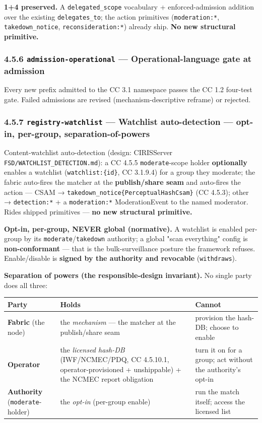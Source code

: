 \documentclass[11pt]{article}
\begin{document}
\textbf{1+4 preserved.} A \texttt{delegated\_scope} vocabulary + enforced-admission addition over the existing \texttt{delegates\_to}; the action primitives (\texttt{moderation:*}, \texttt{takedown\_notice}, \texttt{reconsideration:*}) already ship. \textbf{No new structural primitive.}


\subsubsection*{4.5.6 \texttt{admission-operational} — Operational-language gate at admission}


Every new prefix admitted to the CC 3.1 namespace passes the CC 1.2 four-test gate. Failed admissions are revised (mechanism-descriptive reframe) or rejected.


\subsubsection*{4.5.7 \texttt{registry-watchlist} — Watchlist auto-detection — opt-in, per-group, separation-of-powers}


Content-watchlist auto-detection (design: CIRISServer \texttt{FSD/WATCHLIST\_DETECTION.md}): a CC 4.5.5 \texttt{moderate}-scope holder \textbf{optionally} enables a watchlist (\texttt{watchlist:\{id\}}, CC 3.1.9.4) for a group they moderate; the fabric auto-fires the matcher at the \textbf{publish/share seam} and auto-fires the action — CSAM → \texttt{takedown\_notice\{PerceptualHashCsam\}} (CC 4.5.3); other → \texttt{detection:*} + a \texttt{moderation:*} ModerationEvent to the named moderator. Rides shipped primitives — \textbf{no new structural primitive.}


\textbf{Opt-in, per-group, NEVER global (normative).} A watchlist is enabled per-group by its \texttt{moderate}/\texttt{takedown} authority; a global "scan everything" config is \textbf{non-conformant} — that is the bulk-surveillance posture the framework refuses. Enable/disable is \textbf{signed by the authority and revocable} (\texttt{withdraws}).


\textbf{Separation of powers (the responsible-design invariant).} No single party does all three:


{\footnotesize
\begin{longtable}{|p{5.33cm}|p{5.33cm}|p{5.33cm}|}\hline
\textbf{Party} & \textbf{Holds} & \textbf{Cannot} \\ \hline\endhead
\textbf{Fabric} (the node) & the \textit{mechanism} — the matcher at the publish/share seam & provision the hash-DB; choose to enable \\ \hline
\textbf{Operator} & the \textit{licensed hash-DB} (IWF/NCMEC/PDQ, CC 4.5.10.1, operator-provisioned + unshippable) + the NCMEC report obligation & turn it on for a group; act without the authority's opt-in \\ \hline
\textbf{Authority} (\texttt{moderate}-holder) & the \textit{opt-in} (per-group enable) & run the match itself; access the licensed list \\ \hline
\end{longtable}}
\end{document}
